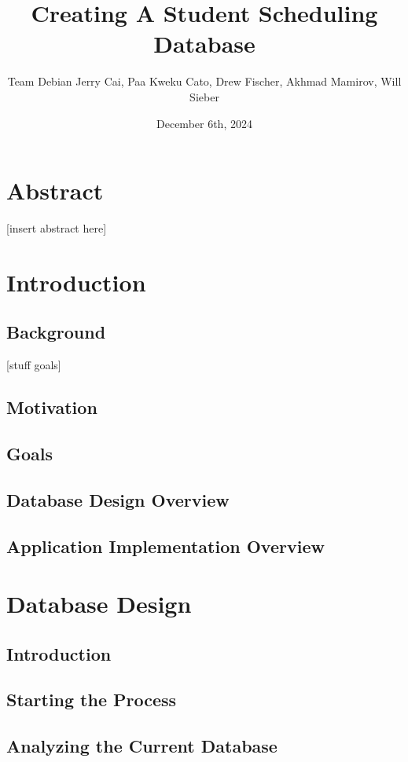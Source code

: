 \documentclass[12pt]{article}
\title{Creating A Student Scheduling Database}
\date{December 6th, 2024}
\author{\parbox{\linewidth}{\centering%
	Team Debian
	\endgraf\bigskip
	Jerry Cai, Paa Kweku Cato, Drew Fischer, Akhmad Mamirov, Will Sieber
	\bigskip
}}
\begin{document}
\maketitle

\newpage
\tableofcontents
\newpage

\section{Abstract}
[insert abstract here]
\newpage

\section{Introduction}

\subsection{Background}
[stuff goals]

\subsection{Motivation}
\subsection{Goals}
\subsection{Database Design Overview}
\subsection{Application Implementation Overview}

\section{Database Design}
\subsection{Introduction}
\subsection{Starting the Process}
\subsection{Analyzing the Current Database}
\end{document}
